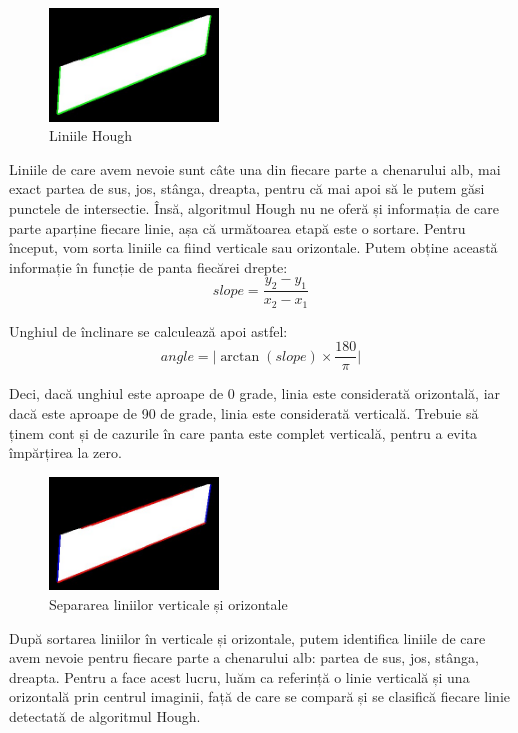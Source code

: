\documentclass[a4paper,12pt]{report}
\begin{document}
\begin{figure}[h!]
    \centering
    \includegraphics[width=0.4\textwidth]{images/lines.jpg}
    \caption{Liniile Hough}
\end{figure}
\FloatBarrier

Liniile de care avem nevoie sunt câte una din fiecare parte a chenarului alb, mai exact partea de sus, jos, stânga, dreapta, pentru că mai apoi să le putem găsi punctele de intersectie. Însă, algoritmul Hough nu ne oferă și informația de care parte aparține fiecare linie, așa că următoarea etapă este o sortare. Pentru început, vom sorta liniile ca fiind verticale sau orizontale. Putem obține această informație în funcție de panta fiecărei drepte:
\[
    slope = \frac{y_2 - y_1}{x_2 - x_1}
\]

Unghiul de înclinare se calculează apoi astfel:
\[
    angle = \lvert \arctan(slope) \times \frac{180}{\pi} \rvert
\]

Deci, dacă unghiul este aproape de 0 grade, linia este considerată orizontală, iar dacă este aproape de 90 de grade, linia este considerată verticală. Trebuie să ținem cont și de cazurile în care panta este complet verticală, pentru a evita împărțirea la zero.

\begin{figure}[h!]
    \centering
    \includegraphics[width=0.4\textwidth]{images/horizontal_vertical_lines.jpg}
    \caption{Separarea liniilor verticale și orizontale}
\end{figure}
\FloatBarrier

După sortarea liniilor în verticale și orizontale, putem identifica liniile de care avem nevoie pentru fiecare parte a chenarului alb: partea de sus, jos, stânga, dreapta. Pentru a face acest lucru, luăm ca referință o linie verticală și una orizontală prin centrul imaginii, față de care se compară și se clasifică fiecare linie detectată de algoritmul Hough.
\end{document}

